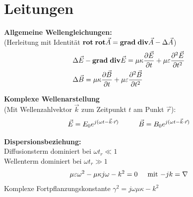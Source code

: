 \documentclass[german]{latex4ei/latex4ei_sheet}
\begin{document}
\section{Leitungen}
\begin{sectionbox}
    \textbf{Allgemeine Wellengleichungen:}\\
    (Herleitung mit Identität $\mathbf{rot} \hspace{1mm} \mathbf{rot} \vec{A} = \mathbf{grad} \hspace{1mm} \mathbf{div}\vec{A} - \Delta \vec{A}$)
    \begin{equation*}
        \begin{aligned}
            &\Delta \vec{E} - \mathbf{grad} \hspace{1mm} \mathbf{div} \vec{E} = \mu \kappa \frac{\partial \vec{E}}{\partial t} + \mu \varepsilon \frac{\partial^2 \vec{E}}{\partial t^2}\\
            &\Delta \vec{B} = \mu \kappa \frac{\partial \vec{B}}{\partial t}+ \mu \varepsilon \frac{\partial^2 \vec{B}}{\partial t^2}
        \end{aligned}
    \end{equation*}

    \textbf{Komplexe Wellenarstellung}\\
    (Mit Wellenzahlvektor $\vec{k}$  zum Zeitpunkt $t$ am Punkt $\vec{r}$):
    \begin{equation*}
            \vec{E} = E_0 e^{j(\omega t - \vec{k} \cdot \vec{r})} \hspace{10mm} \vec{B} = B_0 e^{j(\omega t - \vec{k} \cdot \vec{r})}\\
    \end{equation*}

    \textbf{Dispersionsbeziehung:} \vspace{1mm}\\
    Diffusionsterm dominiert bei $\omega t_r \ll 1$ \\Wellenterm dominiert bei $\omega t_r \gg 1$\\
    \begin{equation*}
        \mu \varepsilon \omega^2 - \mu \kappa j \omega - k^2 = 0 \hspace{5mm} \text{mit $-jk =\nabla $}
    \end{equation*}
    Komplexe Fortpflanzungskonstante $\gamma^2 = j \omega \mu \kappa - k^2$\\


\end{sectionbox}
\end{document}
